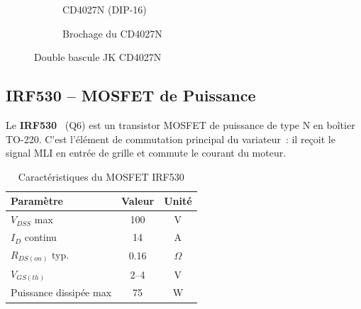 \documentclass[a4paper,12pt,openany]{book}
\begin{document}
\begin{figure}[H]
  \centering
  \begin{subfigure}[b]{0.45\textwidth}
    \centering
    \caption{CD4027N (DIP-16)}
  \end{subfigure}
  \hfill
  \begin{subfigure}[b]{0.50\textwidth}
    \centering
    \caption{Brochage du CD4027N}
  \end{subfigure}
  \caption{Double bascule JK CD4027N}
  \label{fig:cd4027}
\end{figure}

\subsection{IRF530 -- MOSFET de Puissance}

Le \textbf{IRF530}~\cite{IRF530DS} (Q6) est un transistor MOSFET de
puissance de type N en bo\^itier TO-220. C'est l'\'el\'ement de commutation
principal du variateur~: il re\c coit le signal MLI en entr\'ee de grille
et commute le courant du moteur.

\begin{table}[H]
  \centering
  \caption{Caract\'eristiques du MOSFET IRF530}
  \begin{tabular}{|l|c|c|}
    \hline
    \textbf{Param\`etre} & \textbf{Valeur} & \textbf{Unit\'e} \\
    \hline
    $V_{DSS}$ max            & 100  & V        \\
    $I_D$ continu            & 14   & A        \\
    $R_{DS(on)}$ typ.        & 0.16 & $\Omega$ \\
    $V_{GS(th)}$             & 2--4 & V        \\
    Puissance dissip\'ee max & 75   & W        \\
    \hline
  \end{tabular}
  \label{tab:irf530}
\end{table}
\end{document}
